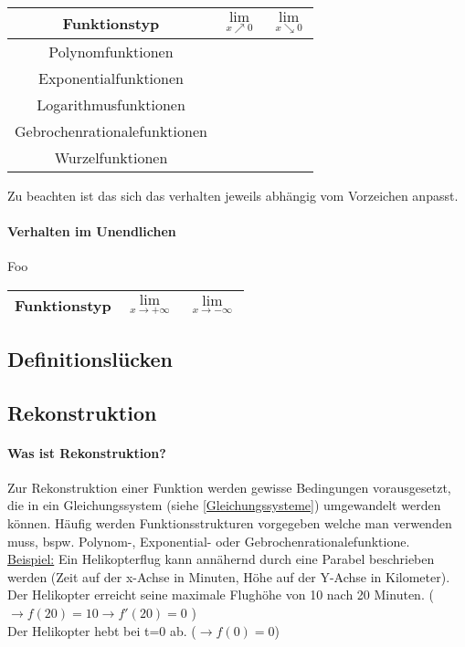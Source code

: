 \documentclass{article}
\begin{document}
		\begin{tabular}{|c|c|c|}
			\hline 
			Funktionstyp & $\lim\limits_{x \nearrow 0}$& $\lim\limits_{x \searrow 0}$ \\
			\hline
			Polynomfunktionen & & \\
			\hline
			Exponentialfunktionen & & \\
			\hline
			Logarithmusfunktionen & & \\
			\hline
			Gebrochenrationalefunktionen & & \\
			\hline
			Wurzelfunktionen & & \\ 
			\hline
		\end{tabular}
		 Zu beachten ist das sich das verhalten jeweils abhängig vom Vorzeichen anpasst.
		
		\paragraph{Verhalten im Unendlichen}\label{Verhalten Im unendlichen}
			Foo\\
		
		\begin{tabular}{|c|c|c|}
			\hline 
			Funktionstyp & $\lim\limits_{x \rightarrow + \infty}$& $\lim\limits_{x \rightarrow - \infty}$\\
			\hline
			\end{tabular}
		
	\subsection{Definitionslücken}\label{Definitionslücke}
	
	\subsection{Rekonstruktion}\label{Rekonstruktion}
		\paragraph{Was ist Rekonstruktion?}
			Zur Rekonstruktion einer Funktion werden gewisse Bedingungen vorausgesetzt, die in ein Gleichungssystem (siehe \ref{Gleichungssysteme}) umgewandelt werden können. Häufig werden Funktionsstrukturen vorgegeben welche man verwenden muss, bspw. Polynom-, Exponential- oder Gebrochenrationalefunktione. \\
			\underline{Beispiel:} Ein Helikopterflug kann annähernd durch eine Parabel beschrieben werden (Zeit auf der x-Achse in Minuten, Höhe auf der Y-Achse in Kilometer). \\
			Der Helikopter erreicht seine maximale Flughöhe von 10 nach 20 Minuten. ( $ \rightarrow f(20)=10 \rightarrow f'(20)=0 $ ) \\
			Der Helikopter hebt bei t=0 ab. ($ \rightarrow f(0)=0$) \\
			
\end{document}
